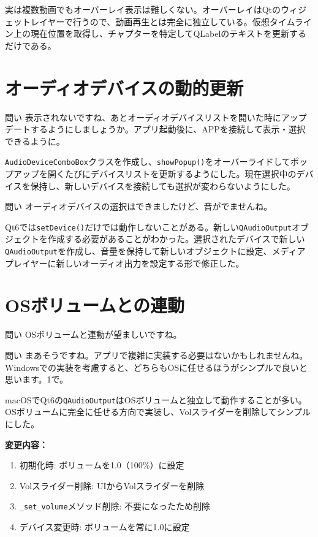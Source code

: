 \documentclass[10pt,a4paper,twocolumn]{article}
\begin{document}
実は複数動画でもオーバーレイ表示は難しくない。オーバーレイはQtのウィジェットレイヤーで行うので、動画再生とは完全に独立している。仮想タイムライン上の現在位置を取得し、チャプターを特定してQLabelのテキストを更新するだけである。

\section{オーディオデバイスの動的更新}

\begin{itembox}[l]{問い}
表示されないですね、あとオーディオデバイスリストを開いた時にアップデートするようにしましょうか。アプリ起動後に、APPを接続して表示・選択できるように。
\end{itembox}

\texttt{AudioDeviceComboBox}クラスを作成し、\texttt{showPopup()}をオーバーライドしてポップアップを開くたびにデバイスリストを更新するようにした。現在選択中のデバイスを保持し、新しいデバイスを接続しても選択が変わらないようにした。

\begin{itembox}[l]{問い}
オーディオデバイスの選択はできましたけど、音がでませんね。
\end{itembox}

Qt6では\texttt{setDevice()}だけでは動作しないことがある。新しい\texttt{QAudioOutput}オブジェクトを作成する必要があることがわかった。選択されたデバイスで新しい\texttt{QAudioOutput}を作成し、音量を保持して新しいオブジェクトに設定、メディアプレイヤーに新しいオーディオ出力を設定する形で修正した。

\section{OSボリュームとの連動}

\begin{itembox}[l]{問い}
OSボリュームと連動が望ましいですね。
\end{itembox}

\begin{itembox}[l]{問い}
まあそうですね。アプリで複雑に実装する必要はないかもしれませんね。Windowsでの実装を考慮すると、どちらもOSに任せるほうがシンプルで良いと思います。1で。
\end{itembox}

macOSでQt6の\texttt{QAudioOutput}はOSボリュームと独立して動作することが多い。OSボリュームに完全に任せる方向で実装し、Volスライダーを削除してシンプルにした。

\textbf{変更内容：}
\begin{enumerate}
    \item 初期化時: ボリュームを1.0（100\%）に設定
    \item Volスライダー削除: UIからVolスライダーを削除
    \item \texttt{\_set\_volume}メソッド削除: 不要になったため削除
    \item デバイス変更時: ボリュームを常に1.0に設定
\end{enumerate}
\end{document}
